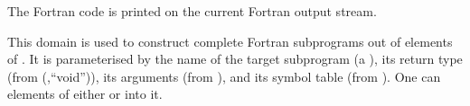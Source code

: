 The Fortran code is printed
on the current Fortran output stream.


This domain is used to construct complete Fortran subprograms out of
elements of .  It is parameterised by the name of the
target subprogram (a ), its return type (from
(,``void'')),
its arguments (from ), and
its symbol table (from ).  One can
 elements of either 
or  into it.

